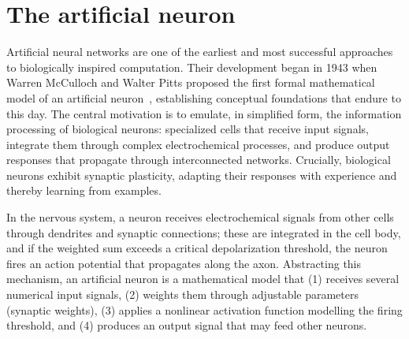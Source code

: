 \section{The artificial neuron}
\label{sec:found:neuron}

Artificial neural networks are one of the earliest and most successful
approaches to biologically inspired computation. Their development began in 1943
when Warren McCulloch and Walter Pitts proposed the first formal mathematical
model of an artificial neuron~\citep{McCullochPitts1943}, establishing
conceptual foundations that endure to this day. The central motivation is to
emulate, in simplified form, the information processing of biological neurons:
specialized cells that receive input signals, integrate them through complex
electrochemical processes, and produce output responses that propagate through
interconnected networks. Crucially, biological neurons exhibit synaptic
plasticity, adapting their responses with experience and thereby learning from
examples.

In the nervous system, a neuron receives electrochemical signals from other
cells through dendrites and synaptic connections; these are integrated in the
cell body, and if the weighted sum exceeds a critical depolarization threshold,
the neuron fires an action potential that propagates along the axon. Abstracting
this mechanism, an artificial neuron is a mathematical model that (1) receives
several numerical input signals, (2) weights them through adjustable parameters
(synaptic weights), (3) applies a nonlinear activation function modelling the
firing threshold, and (4) produces an output signal that may feed other neurons.

